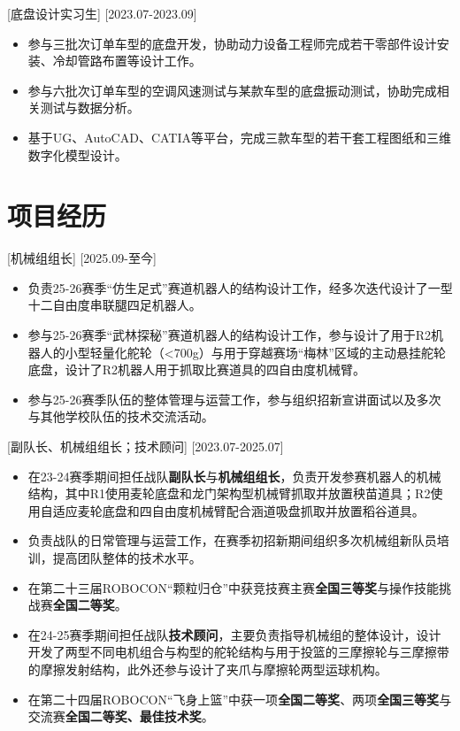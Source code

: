 \documentclass{resume}
\begin{document}
[底盘设计实习生]
[2023.07-2023.09]

\begin{itemize}
  \item 参与三批次订单车型的底盘开发，协助动力设备工程师完成若干零部件设计安装、冷却管路布置等设计工作。
  \item 参与六批次订单车型的空调风速测试与某款车型的底盘振动测试，协助完成相关测试与数据分析。 
  \item 基于UG、AutoCAD、CATIA等平台，完成三款车型的若干套工程图纸和三维数字化模型设计。

\end{itemize}

\section{项目经历}

[机械组组长]
[2025.09-至今]
\begin{itemize}
  \item 负责25-26赛季“仿生足式”赛道机器人的结构设计工作，经多次迭代设计了一型十二自由度串联腿四足机器人。
  \item 参与25-26赛季“武林探秘”赛道机器人的结构设计工作，参与设计了用于R2机器人的小型轻量化舵轮（<700g）与用于穿越赛场“梅林”区域的主动悬挂舵轮底盘，设计了R2机器人用于抓取比赛道具的四自由度机械臂。
  \item 参与25-26赛季队伍的整体管理与运营工作，参与组织招新宣讲面试以及多次与其他学校队伍的技术交流活动。
\end{itemize}

[副队长、机械组组长；技术顾问]
[2023.07-2025.07]
\begin{itemize}
  \item 在23-24赛季期间担任战队\textbf{副队长}与\textbf{机械组组长}，负责开发参赛机器人的机械结构，其中R1使用麦轮底盘和龙门架构型机械臂抓取并放置秧苗道具；R2使用自适应麦轮底盘和四自由度机械臂配合涵道吸盘抓取并放置稻谷道具。
  \item 负责战队的日常管理与运营工作，在赛季初招新期间组织多次机械组新队员培训，提高团队整体的技术水平。
  \item 在第二十三届ROBOCON“颗粒归仓”中获竞技赛主赛\textbf{全国三等奖}与操作技能挑战赛\textbf{全国二等奖}。
  \item 在24-25赛季期间担任战队\textbf{技术顾问}，主要负责指导机械组的整体设计，设计开发了两型不同电机组合与构型的舵轮结构与用于投篮的三摩擦轮与三摩擦带的摩擦发射结构，此外还参与设计了夹爪与摩擦轮两型运球机构。
  \item 在第二十四届ROBOCON“飞身上篮”中获一项\textbf{全国二等奖}、两项\textbf{全国三等奖}与交流赛\textbf{全国二等奖、最佳技术奖}。
\end{itemize}
\end{document}
